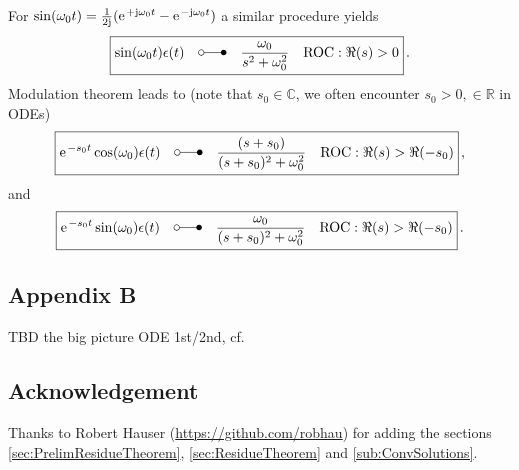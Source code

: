 \documentclass[11pt,a4paper,DIV=12]{scrartcl}
\begin{document}
\noindent For $\sin(\omega_0 t) = \frac{1}{2 \im} (\e^{+\im \omega_0 t}-\e^{-\im \omega_0 t})$ a similar
procedure yields
\begin{align}
\boxed{
\sin(\omega_0 t)\epsilon(t)\quad \laplace \quad \frac{\omega_0}{s^2 + \omega_0^2} \quad \text{ROC}: \Re(s)>0}\,.
\end{align}
%
Modulation theorem leads to (note that $s_0 \in \mathbb{C}$, we often encounter $s_0 > 0, \in \mathbb{R}$ in ODEs)
\begin{align}
\boxed{\e^{-s_0 t} \cos(\omega_0) \epsilon(t)\quad \laplace \quad \frac{(s+s_0)}{(s+s_0)^2 + \omega_0^2}\quad \text{ROC}: \Re(s)>\Re(-s_0)}\,,
\end{align}
and
\begin{align}
\boxed{\e^{-s_0 t} \sin(\omega_0) \epsilon(t)\quad \laplace \quad \frac{\omega_0}{(s+s_0)^2 + \omega_0^2}\quad \text{ROC}: \Re(s)>\Re(-s_0)}\,.
\end{align}


\subsection*{Appendix B}
TBD the big picture ODE 1st/2nd, cf. \cite[p.117]{Strang2014}

\subsection*{Acknowledgement}
Thanks to Robert Hauser (\url{https://github.com/robhau})
for adding the sections \ref{sec:PrelimResidueTheorem}, \ref{sec:ResidueTheorem} and
\ref{sub:ConvSolutions}.


\end{document}
